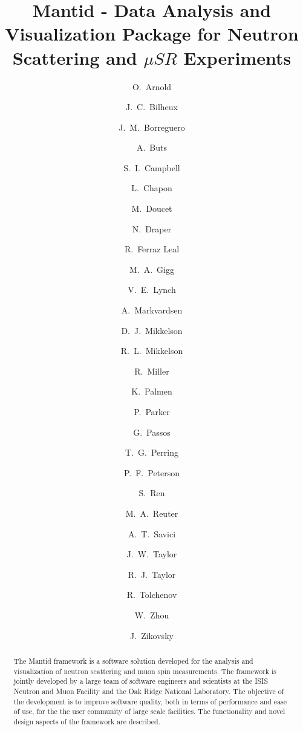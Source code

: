 \documentclass[1p]{elsarticle}
\begin{document}
\begin{frontmatter}



\title{Mantid - Data Analysis and Visualization Package for Neutron Scattering and $\mu SR$ Experiments}

\author[isis,tessellaUK]{O.~Arnold}
\author[ornl]{J.~C.~Bilheux}
\author[ornl]{J.~M.~Borreguero}
\author[isis]{A.~Buts}
\author[ornl]{S.~I.~Campbell}
\author[isis,ill]{L.~Chapon}
\author[ornl]{M.~Doucet}
\author[isis,tessellaUK]{N.~Draper}
\author[ill]{R.~Ferraz Leal}
\author[isis,tessellaUK]{M.~A.~Gigg}
\author[ornl]{V.~E.~Lynch}
\author[isis]{A.~Markvardsen}
\author[uws,ornl]{D.~J.~Mikkelson}
\author[uws,ornl]{R.~L.~Mikkelson}
\author[nccsornl]{R.~Miller}
\author[isis]{K.~Palmen}
\author[isis]{P.~Parker}
\author[isis]{G.~Passos}
\author[isis]{T.~G.~Perring}
\author[ornl]{P.~F.~Peterson}
\author[ornl]{S.~Ren}
\author[ornl]{M.~A.~Reuter}
\author[ornl]{A.~T.~Savici}
\let\thefootnote\relax{}
\author[isis]{J.~W.~Taylor}
\author[ornl,tessellaUS]{R.~J.~Taylor}
\author[isis,tessellaUK]{R.~Tolchenov}
\author[ornl]{W.~Zhou}
\author[ornl]{J.~Zikovsky}

\address[isis]{ISIS Facility, Rutherford Appleton Laboratory, Chilton, Didcot, Oxfordshire, UK}
\address[tessellaUK]{Tessella Ltd., Abingdon, Oxfordshire, UK}
\address[ornl]{Neutron Data Analysis and Visualization, Oak Ridge National Laboratory, Oak~Ridge,~TN,~USA}


\address[ill]{Institut Laue-Langevin, Grenoble, France}
\address[uws]{University of Wisconsin-Stout, Menomonie, WI, USA}
\address[nccsornl]{Computing and Computational Science Directorate, Oak Ridge National Laboratory, Oak~Ridge,~TN,~USA}
\address[tessellaUS]{Tessella Inc., Newton, MA, USA}


\begin{abstract}
The Mantid framework is a software solution developed for the analysis and visualization of neutron scattering and muon spin measurements. The framework is jointly developed by a large team of software engineers and scientists at the ISIS Neutron and Muon Facility and the Oak Ridge National Laboratory.  The objective of the development is to improve software quality, both in terms of performance and ease of use, for the the user community of large scale facilities. 
The functionality and novel design aspects of the framework are described.
\end{abstract}


\end{frontmatter}
\end{document}
